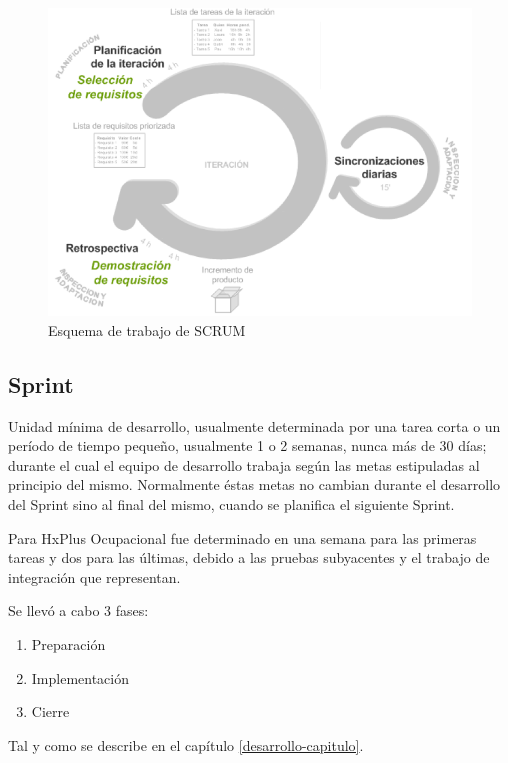     \begin{figure}[htbp!]
        \begin{center}
            \includegraphics[width=.8\textwidth]{figures/scrum}
        \end{center}
        \caption{Esquema de trabajo de SCRUM}
        \label{scrum-esquema}
    \end{figure}
    
        \subsection{Sprint}
        
        Unidad mínima de desarrollo, usualmente determinada por una tarea corta o un período de tiempo pequeño, usualmente 1 o 2 semanas, nunca más de 30 días; durante el cual el equipo de desarrollo trabaja según las metas estipuladas al principio del mismo. Normalmente éstas metas no cambian durante el desarrollo del Sprint sino al final del mismo, cuando se planifica el siguiente Sprint.
        
        Para HxPlus Ocupacional fue determinado en una semana para las primeras tareas y dos para las últimas, debido a las pruebas subyacentes y el trabajo de integración que representan.
        
        Se llevó a cabo 3 fases:
        \begin{enumerate}
            \item Preparación
            \item Implementación
            \item Cierre
        \end{enumerate}
        
        Tal y como se describe en el capítulo \ref{desarrollo-capitulo}.
        
